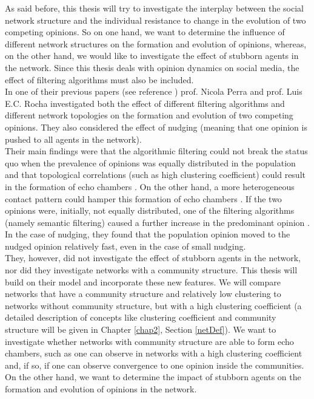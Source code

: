 \documentclass[11 pt , letterpaper , twoside , openright]{book}
\begin{document}
As said before, this thesis will try to investigate the interplay between the social network structure and the individual resistance to change in the evolution of two competing opinions. So on one hand, we want to determine the influence of different network structures on the formation and evolution of opinions, whereas, on the other hand, we would like to investigate the effect of stubborn agents in the network. Since this thesis deals with opinion dynamics on social media, the effect of filtering algorithms must also be included.\\ 
\newline
In one of their previous papers (see reference \cite{Perra2019}) prof. Nicola Perra and prof. Luis E.C. Rocha investigated both the effect of different filtering algorithms and different network topologies on the formation and evolution of two competing opinions. They also considered the effect of nudging (meaning that one opinion is pushed to all agents in the network).\\ Their main findings were that the algorithmic filtering could not break the status quo when the prevalence of opinions was equally distributed in the population and that topological correlations (such as high clustering coefficient) could result in the formation of echo chambers \cite{Perra2019}. On the other hand, a more heterogeneous contact pattern could hamper this formation of echo chambers \cite{Perra2019}. If the two opinions were, initially, not equally distributed, one of the filtering algorithms (namely semantic filtering) caused a further increase in the predominant opinion \cite{Perra2019}. In the case of nudging, they found that the population opinion moved to the nudged opinion relatively fast, even in the case of small nudging.\\
They, however, did not investigate the effect of stubborn agents in the network, nor did they investigate networks with a community structure. This thesis will build on their model and incorporate these new features. We will compare networks that have a community structure and relatively low clustering to networks without community structure, but with a high clustering coefficient (a detailed description of concepts like clustering coefficient and community structure will be given in Chapter \ref{chap2}, Section \ref{netDef}). We want to investigate whether networks with community structure are able to form echo chambers, such as one can observe in networks with a high clustering coefficient and, if so, if one can observe convergence to one opinion inside the communities. On the other hand, we want to determine the impact of stubborn agents on the formation and evolution of opinions in the network.
\end{document}

